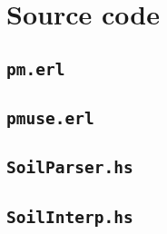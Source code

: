 
\section{Source code}

\subsection{\texttt{pm.erl}}


\subsection{\texttt{pmuse.erl}}


\subsection{\texttt{SoilParser.hs}}
\label{source:parser}


\subsection{\texttt{SoilInterp.hs}}

